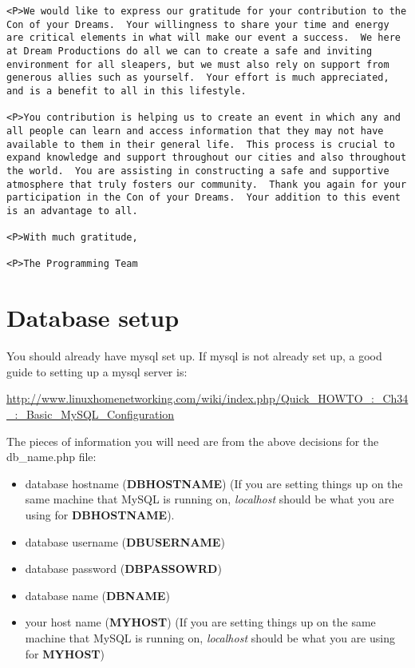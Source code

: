 \documentclass[tablesignature]{scrartcl}
\begin{document}
\begin{verbatim}
<P>We would like to express our gratitude for your contribution to the
Con of your Dreams.  Your willingness to share your time and energy
are critical elements in what will make our event a success.  We here
at Dream Productions do all we can to create a safe and inviting
environment for all sleapers, but we must also rely on support from
generous allies such as yourself.  Your effort is much appreciated,
and is a benefit to all in this lifestyle.

<P>You contribution is helping us to create an event in which any and
all people can learn and access information that they may not have
available to them in their general life.  This process is crucial to
expand knowledge and support throughout our cities and also throughout
the world.  You are assisting in constructing a safe and supportive
atmosphere that truly fosters our community.  Thank you again for your
participation in the Con of your Dreams.  Your addition to this event
is an advantage to all.

<P>With much gratitude,

<P>The Programming Team
\end{verbatim}
\section{Database setup}
\label{sec-4}

  You should already have mysql set up.  If mysql is not already set
  up, a good guide to setting up a mysql server is:

\begin{small}
  \href{http://www.linuxhomenetworking.com/wiki/index.php/Quick_HOWTO_:_Ch34_:_Basic_MySQL_Configuration}{http://www.linuxhomenetworking.com/wiki/index.php/Quick\_HOWTO\_:\_Ch34\_:\_Basic\_MySQL\_Configuration}
\end{small}

  The pieces of information you will need are from the above decisions
  for the db\_{}name.php file:

\begin{itemize}
\item database hostname (\textbf{DBHOSTNAME}) (If you are setting things up on
    the same machine that MySQL is running on, \emph{localhost} should be
    what you are using for \textbf{DBHOSTNAME}).
\item database username (\textbf{DBUSERNAME})
\item database password (\textbf{DBPASSOWRD})
\item database name (\textbf{DBNAME})
\item your host name (\textbf{MYHOST}) (If you are setting things up on the
    same machine that MySQL is running on, \emph{localhost} should be what
    you are using for \textbf{MYHOST})
\end{itemize}
\end{document}
